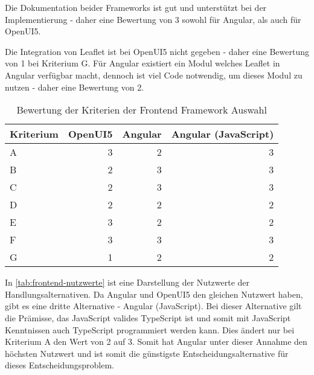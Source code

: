 Die Dokumentation beider Frameworks ist gut und unterstützt bei der Implementierung - daher eine Bewertung von 3 sowohl für Angular, als auch für OpenUI5.

Die Integration von Leaflet ist bei OpenUI5 nicht gegeben - daher eine Bewertung von 1 bei Kriterium G.
Für Angular existiert ein Modul welches Leaflet in Angular verfügbar macht, dennoch ist viel Code notwendig, um dieses Modul zu nutzen - daher eine Bewertung von 2.


\begin{table}[h]
	\caption{Bewertung der Kriterien der Frontend Framework Auswahl}
	\begin{center}
		\begin{tabular}{lrrr}
			\toprule
			Kriterium & \multicolumn{1}{l}{OpenUI5} & \multicolumn{1}{l}{Angular} & \multicolumn{1}{l}{Angular (JavaScript)} \\ \midrule
			A         &                           3 &                           2 &                               3 \\
			B         &                           2 &                           3 &                               3 \\
			C         &                           2 &                           3 &                               3 \\
			D         &                           2 &                           2 &                               2 \\
			E         &                           3 &                           2 &                               2 \\
			F         &                           3 &                           3 &                               3 \\
			G         &                           1 &                           2 &                               2 \\ \bottomrule
		\end{tabular}
	\end{center}
	\label{tab:frontend-bewertung}
\end{table}

In \autoref{tab:frontend-nutzwerte} ist eine Darstellung der Nutzwerte der Handlungsalternativen.
Da Angular und OpenUI5 den gleichen Nutzwert haben, gibt es eine dritte Alternative - Angular (JavaScript).
Bei dieser Alternative gilt die Prämisse, das JavaScript valides TypeScript ist und somit mit JavaScript Kenntnissen auch TypeScript programmiert werden kann.
Dies ändert nur bei Kriterium A den Wert von 2 auf 3.
Somit hat Angular unter dieser Annahme den höchsten Nutzwert und ist somit die günstigste Entscheidungsalternative für dieses Entscheidungsproblem.

